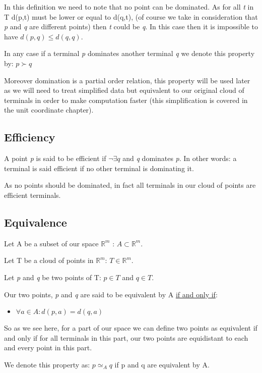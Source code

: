In this definition we need to note that no point can be dominated. As for all \emph{t} in T d(p,t) must be lower or equal to d(q,t), (of course we take in consideration that \emph{p} and \emph{q} are different points) then \emph{t} could be \emph{q}. In this case then it is impossible to have $d(p,q)\leq d(q,q)$.

In any case if a terminal \emph{p} dominates another terminal \emph{q} we denote this property by: $ p \succ q $\newline

Moreover domination is a partial order relation, this property will be used later as we will need to treat simplified data but equivalent to our original cloud of terminals in order to make computation faster (this simplification is covered in the unit coordinate chapter).
\subsection{Efficiency}%
A point \emph{p} is said to be efficient if $\neg\exists q$ and \emph{q} dominates \emph{p}. In other words: a terminal is said efficient if no other terminal is dominating it.

As no points should be dominated, in fact all terminals in our cloud of points are efficient terminals.
\subsection{Equivalence} %
Let A be a subset of  our space $\mathbb{R}^m$ : $A \subset \mathbb{R}^m$.

Let T be a cloud of points in $\mathbb{R}^m$: $T \in \mathbb{R}^m$.

Let \emph{p} and \emph{q} be two points of T: $p \in T$ and $q \in T$.

\noindent Our two points, \emph{p} and \emph{q} are said to be equivalent by A \underline{if and only if}:
\begin{itemize}[noitemsep, nolistsep]
	\item{$\forall a \in A : d(p,a) = d(q,a)$}
\end{itemize} 

So as we see here, for a part of our space we can define two points as equivalent if and only if for all terminals in this part, our two points are equidistant to each and every point in this part.

We denote this property as: $p \simeq_{A} q$ if p and q are equivalent by A.

